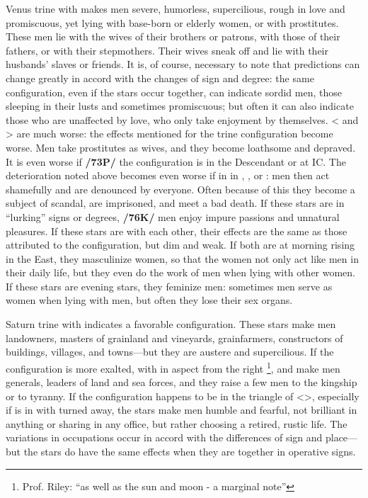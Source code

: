 Venus \marginnote{\Venus \Trine \Saturn} trine with \Saturn\xspace makes men severe, humorless, supercilious, rough in love and promiscuous, yet lying with base-born or elderly women, or with prostitutes. These men lie with the wives of their brothers or patrons, with those of their fathers, or with their stepmothers. Their wives sneak off and lie with their husbands’ slaves or friends. \mndl It is, of course, necessary to note that predictions can change greatly
in accord with the changes of sign and degree: the same configuration, even if the stars occur together, can
indicate sordid men, those sleeping in their lusts and sometimes promiscuous; but often it can also indicate
those who are unaffected by love, who only take enjoyment by themselves. <\Venus\xspace and \Saturn> \Square\xspace are much worse: the effects mentioned for the trine configuration become worse. Men take prostitutes as wives, and they become loathsome and depraved. It is even worse if \textbf{/73P/} the configuration is in the Descendant or at IC. The deterioration noted above becomes even worse if \Mars\xspace in in \Conjunction, \Square, or \Opposition: men then act shamefully and are denounced by everyone. Often because of this they become a subject of scandal, are imprisoned, and meet a bad death. If these stars are in “lurking” signs or degrees,
\textbf{/76K/} men enjoy impure passions and unnatural pleasures. If these stars are \Sextile\xspace with each other, their effects are the same as those attributed to the \Trine\xspace configuration, but dim and weak. If both are at morning rising in the East, they masculinize women, so that the women not only act like men in their daily life, but
they even do the work of men when lying with other women. If these stars are evening stars, they feminize men: sometimes men serve as women when lying with men, but often they lose their sex organs.

Saturn \marginnote{\Saturn \Trine \Jupiter} trine with \Jupiter\xspace indicates a favorable configuration. These stars make men landowners, masters of grainland and vineyards, grainfarmers, constructors of buildings, villages, and towns—but they are austere and supercilious. If the configuration is more exalted, with \Mars\xspace in aspect from the right
\footnote{Prof. Riley: ``as well as the sun and moon - a marginal note''},
\Saturn\xspace and \Jupiter\xspace make men generals, leaders of land and sea forces, and they raise a few men to the
kingship or to tyranny. If the configuration happens to be in the triangle of \Saturn\xspace <\Gemini\xspace \Libra\xspace \Aquarius>, especially if \Jupiter\xspace is in \Aquarius\xspace with \Mars\xspace turned away, the stars make men humble and fearful, not brilliant in anything or sharing in any office, but rather choosing a retired, rustic life. \mndl The variations in occupations occur in accord with the differences of sign and place—but the stars do have the same effects when they are together in operative signs.

